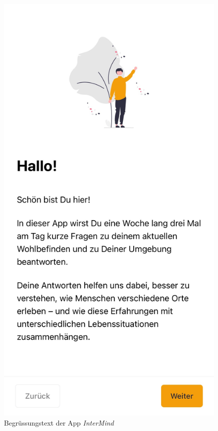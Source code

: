 \begin{figure}[h]
\begin{minipage}[t]{0.38\textwidth}
        \label{fig:startscreen}
    \end{minipage}
    \hspace{0.1\textwidth}
    \begin{minipage}[t]{0.38\textwidth}
        \centering
        \includegraphics[width=\textwidth]{Arbeit/images/printscreens/welcome.jpeg}
        \caption{Begrüssungstext der App \textit{InterMind}}
        \label{fig:welcome}
    \end{minipage}
\end{figure}


